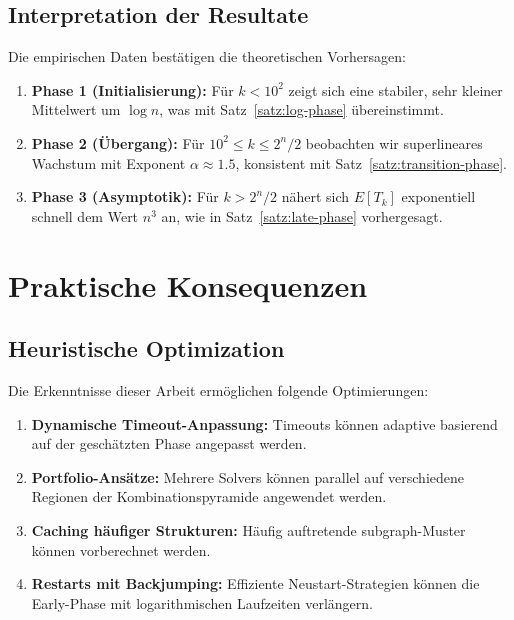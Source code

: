 ﻿\documentclass[a4paper,12pt]{article}
\theoremstyle{definition}
\begin{document}
\subsection{Interpretation der Resultate}

Die empirischen Daten bestätigen die theoretischen Vorhersagen:

\begin{enumerate}
	\item \textbf{Phase 1 (Initialisierung):} Für $k < 10^2$ zeigt sich eine stabiler, sehr kleiner Mittelwert um $\log n$, was mit Satz~\ref{satz:log-phase} übereinstimmt.
	
	\item \textbf{Phase 2 (Übergang):} Für $10^2 \leq k \leq 2^n/2$ beobachten wir superlineares Wachstum mit Exponent $\alpha \approx 1.5$, konsistent mit Satz~\ref{satz:transition-phase}.
	
	\item \textbf{Phase 3 (Asymptotik):} Für $k > 2^n/2$ nähert sich $E[T_k]$ exponentiell schnell dem Wert $n^3$ an, wie in Satz~\ref{satz:late-phase} vorhergesagt.
\end{enumerate}

\section{Praktische Konsequenzen}

\subsection{Heuristische Optimization}

Die Erkenntnisse dieser Arbeit ermöglichen folgende Optimierungen:

\begin{enumerate}
	\item \textbf{Dynamische Timeout-Anpassung:} Timeouts können adaptive basierend auf der geschätzten Phase angepasst werden.
	
	\item \textbf{Portfolio-Ansätze:} Mehrere Solvers können parallel auf verschiedene Regionen der Kombinationspyramide angewendet werden.
	
	\item \textbf{Caching häufiger Strukturen:} Häufig auftretende subgraph-Muster können vorberechnet werden.
	
	\item \textbf{Restarts mit Backjumping:} Effiziente Neustart-Strategien können die Early-Phase mit logarithmischen Laufzeiten verlängern.
\end{enumerate}
\end{document}
